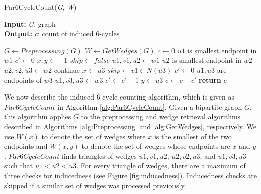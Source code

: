\documentclass[11pt]{article}
\begin{document}
\begin{algorithm}[H]
\caption{Par6CycleCount(\textit{G}, \textit{W})}
\label{alg:Par6CycleCount}
\hspace*{\algorithmicindent} \textbf{Input:} \textit{G}: graph\\
\hspace*{\algorithmicindent} \textbf{Output:} \textit{c}: count of induced 6-cycles
\begin{algorithmic}[1]
    \State $G \gets Preprocessing(G)$
    \State $W \gets GetWedges(G)$
    \State $c \gets 0$
         \Comment $u1$ is smallest endpoint in $w1$
            \State $c' \gets 0$
            \State $x, y \gets -1$
            \State $skip \gets false$
            \State $u1, v1, u2 \gets w1$
             \Comment $u2$ is smallest endpoint in $w2$
                \State $u2, v2, u3 \gets w2$
                    \State continue
                \EndIf
                \State $x \gets u3$
                \State $skip \gets v1 \in N(u3)$
                        \State $c' \gets 0$
                         \Comment $u1, u3$ are endpoints of $w3$
                            \State $u1, v3, u3 \gets w3$
                                \State $c' \gets c' + 1$
                            \EndIf
                        \EndFor
                        \State $y \gets u3$
                    \EndIf
                    \State $c \gets c + c'$
                \EndIf
            \EndFor
        \EndFor
    \EndFor
    \State \textbf{return} $c$
\end{algorithmic}
\end{algorithm}

We now describe the induced 6-cycle counting algorithm, which is given as $Par6CycleCount$ in Algorithm \ref{alg:Par6CycleCount}.
Given a bipartite graph $G$, this algorithm applies $G$ to the preprocessing and wedge retrieval algorithms described in Algorithms \ref{alg:Preprocessing} and \ref{alg:GetWedges}, respectively.
We use $W(x)$ to denote the set of wedges where $x$ is the smallest of the two endpoints and $W(x, y)$ to denote the set of wedges whose endpoints are $x$ and $y$.
$Par6CycleCount$ finds triangles of wedges {$u1, v1, u2$}, {$u2, v2, u3$}, and {$u1, v3, u3$} such that $u1 < u2 < u3$.
For every triangle of wedges, there are a maximum of three checks for inducedness (see Figure \ref{fig:inducedness}).
Inducedness checks are skipped if a similar set of wedges was processed previously.
\end{document}
